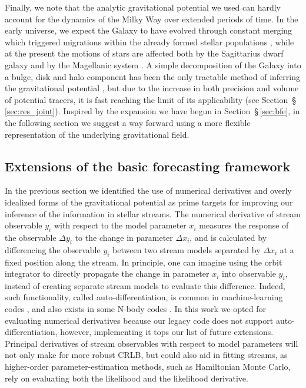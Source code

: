 \documentclass[modern]{aastex61}
\newcommand{\acronym}[1]{{\small{#1}}}
\newcommand{\CRLB}{\acronym{CRLB}}
\newcommand{\package}[1]{\textsl{#1}}
\begin{document}
Finally, we note that the analytic gravitational potential we used can hardly account for the dynamics of the Milky Way over extended periods of time.
In the early universe, we expect the Galaxy to have evolved through constant merging which triggered migrations within the already formed stellar populations \citep[e.g.,][]{elbadry2016,bonaca2017}, while at the present the motions of stars are affected both by the Sagittarius dwarf galaxy \citep{laporte2017} and by the Magellanic system \citep[e.g.,][]{gomez2015,laporte2018a}.
A simple decomposition of the Galaxy into a bulge, disk and halo component has been the only tractable method of inferring the gravitational potential \citep[e.g.,][]{lm10,koposov2010,bovy2016}, but due to the increase in both precision and volume of potential tracers, it is fast reaching the limit of its applicability (see Section~\S\,\ref{sec:res_joint}).
Inspired by the expansion we have begun in Section~\S\,\ref{sec:bfe}, in the following section we suggest a way forward using a more flexible representation of the underlying gravitational field.

\subsection{Extensions of the basic forecasting framework}
\label{sec:dis_extensions}
In the previous section we identified the use of numerical derivatives and overly idealized forms of the gravitational potential as prime targets for improving our inference of the information in stellar streams.
The numerical derivative of stream observable $y_i$ with respect to the model parameter $x_i$ measures the response of the observable $\Delta y_i$ to the change in parameter $\Delta x_i$, and is calculated by differencing the observable $y_i$ between two stream models separated by $\Delta x_i$ at a fixed position along the stream.
In principle, one can imagine using the orbit integrator to directly propagate the change in parameter $x_i$ into observable $y_i$, instead of creating separate stream models to evaluate this difference.
Indeed, such functionality, called auto-differentiation, is common in machine-learning codes \citep[e.g., \package{tensorflow},][]{tensorflow}, and also exists in some N-body codes \citep[e.g., \package{FASTPM},][]{feng2016}.
In this work we opted for evaluating numerical derivatives because our legacy code does not support auto-differentiation, however, implementing it tops our list of future extensions.
Principal derivatives of stream observables with respect to model parameters will not only make for more robust \CRLB, but could also aid in fitting streams, as higher-order parameter-estimation methods, such as Hamiltonian Monte Carlo, rely on evaluating both the likelihood and the likelihood derivative.
\end{document}
